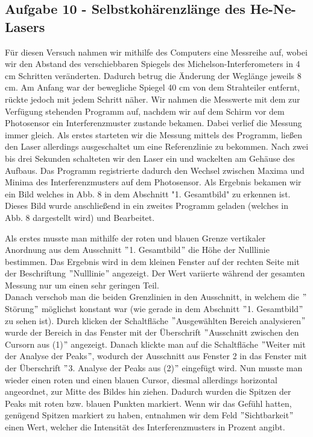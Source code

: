\subsection*{Aufgabe 10 - Selbstkohärenzlänge des He-Ne-Lasers}
Für diesen Versuch nahmen wir mithilfe des Computers eine Messreihe auf, wobei wir den Abstand des verschiebbaren Spiegels des Michelson-Interferometers in 4 cm Schritten veränderten. Dadurch betrug die Änderung der Weglänge jeweils 8 cm. Am Anfang war der bewegliche Spiegel 40 cm von dem Strahteiler entfernt, rückte jedoch mit jedem Schritt näher. Wir nahmen die Messwerte mit dem zur Verfügung stehenden Programm auf, nachdem wir auf dem Schirm vor dem Photosensor ein Interferenzmuster zustande bekamen. 
Dabei verlief die Messung immer gleich. Als erstes starteten wir die Messung mittels des Programm, ließen den Laser allerdings ausgeschaltet um eine Referenzlinie zu bekommen. Nach zwei bis drei Sekunden schalteten wir den Laser ein und wackelten am Gehäuse des Aufbaus. Das Programm registrierte dadurch den Wechsel zwischen Maxima und Minima des Interferenzmusters auf dem Photosensor. Als Ergebnis bekamen wir ein Bild welches in Abb. 8 in dem Abschnitt "1. Gesamtbild" zu erkennen ist. Dieses Bild wurde anschließend in ein zweites Programm geladen (welches in Abb. 8 dargestellt wird) und Bearbeitet. 


Als erstes musste man mithilfe der roten und blauen Grenze vertikaler Anordnung aus dem Ausschnitt $"$1. Gesamtbild$"$ die Höhe der Nulllinie bestimmen. Das Ergebnis wird in dem kleinen Fenster auf der rechten Seite mit der Beschriftung $"$Nulllinie$"$ angezeigt. Der Wert variierte während der gesamten Messung nur um einen sehr geringen Teil.\\
Danach verschob man die beiden Grenzlinien in den Ausschnitt, in welchem die $"$Störung$"$ möglichst konstant war (wie gerade in dem Abschnitt $"$1. Gesamtbild$"$ zu sehen ist). Durch klicken der Schaltfläche $"$Ausgewählten Bereich analysieren$"$ wurde der Bereich in das Fenster mit der Überschrift $"$Ausschnitt zwischen den Cursorn aus (1)$"$ angezeigt. Danach klickte man auf die Schaltfläche $"$Weiter mit der Analyse der Peaks$"$, wodurch der Ausschnitt aus Fenster 2 in das Fenster mit der Überschrift $"$3. Analyse der Peaks aus (2)$"$ eingefügt wird. Nun musste man wieder einen roten und einen blauen Cursor, diesmal allerdings horizontal angeordnet, zur Mitte des Bildes hin ziehen. Dadurch wurden die Spitzen der Peaks mit roten bzw. blauen Punkten markiert. Wenn wir das Gefühl hatten, genügend Spitzen markiert zu haben, entnahmen wir dem Feld $"$Sichtbarkeit$"$ einen Wert, welcher die Intensität des Interferenzmusters in Prozent angibt.

